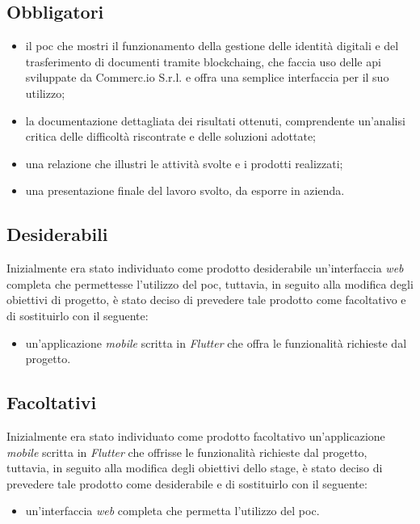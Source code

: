 \subsection{Obbligatori}
\begin{itemize}
	\item il \gls{poc} che mostri il funzionamento della gestione delle identità digitali e del trasferimento di documenti tramite \gls{blockchaing}, che faccia uso delle \gls{api} sviluppate da Commerc.io S.r.l. e offra una semplice interfaccia per il suo utilizzo;
	\item la documentazione dettagliata dei risultati ottenuti, comprendente un'analisi critica delle difficoltà riscontrate e delle soluzioni adottate;
	\item una relazione che illustri le attività svolte e i prodotti realizzati;
	\item una presentazione finale del lavoro svolto, da esporre in azienda.
\end{itemize}

\subsection{Desiderabili}

Inizialmente era stato individuato come prodotto desiderabile un'interfaccia \textit{web} completa che permettesse l'utilizzo del \gls{poc}, tuttavia, in seguito alla modifica degli obiettivi di progetto, è stato deciso di prevedere tale prodotto come facoltativo e di sostituirlo con il seguente:

\begin{itemize}
	\item un'applicazione \textit{mobile} scritta in \textit{Flutter} che offra le funzionalità richieste dal progetto.
\end{itemize}

\subsection{Facoltativi}

Inizialmente era stato individuato come prodotto facoltativo un'applicazione \textit{mobile} scritta in \textit{Flutter} che offrisse le funzionalità richieste dal progetto, tuttavia, in seguito alla modifica degli obiettivi dello stage, è stato deciso di prevedere tale prodotto come desiderabile e di sostituirlo con il seguente:

\begin{itemize}
	\item un'interfaccia \textit{web} completa che permetta l'utilizzo del \gls{poc}.
\end{itemize} 

